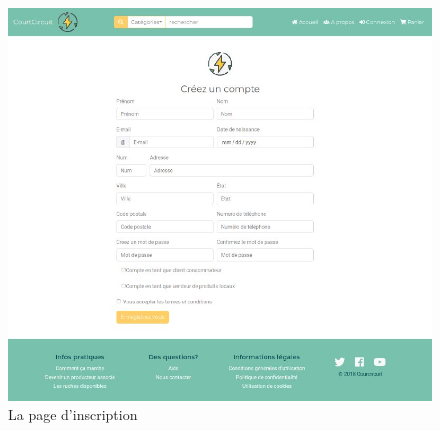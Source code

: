 \documentclass[a4paper,12pt]{report}
\theoremstyle{break}
\theoremstyle{break}
\theoremstyle{break}
\theoremstyle{break}
\theoremstyle{definition}
\theoremstyle{remark}
\begin{document}
\begin{appendices}
\begin{figure}[!ht]
  \centering
  \includegraphics[scale=0.5]{images/signUp.jpeg}
  \caption{La page d'inscription}
\end{figure}


\end{appendices}
\end{document}
